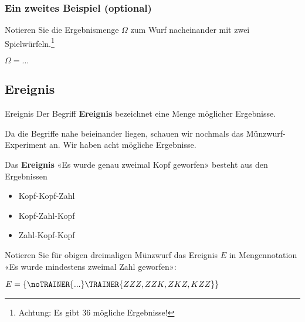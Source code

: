 \subsubsection{Ein zweites Beispiel (optional)}
Notieren Sie die Ergebnismenge $\Omega$ zum Wurf nacheinander mit zwei
Spielwürfeln.\footnote{Achtung: Es gibt 36 mögliche Ergebnisse!}

$\Omega=...$


\TNTeop{}

\newpage
\subsection{Ereignis}
\begin{definition}{Ereignis}{}
Der Begriff \textbf{Ereignis} bezeichnet eine Menge möglicher
Ergebnisse.
\end{definition}

Da die Begriffe nahe beieinander liegen, schauen wir
nochmals das Münzwurf-Experiment an. Wir haben acht mögliche
Ergebnisse. 


Das \textbf{Ereignis} «Es wurde genau zweimal Kopf geworfen» besteht
aus den Ergebnissen

\begin{itemize}
\item Kopf-Kopf-Zahl
\item Kopf-Zahl-Kopf
\item Zahl-Kopf-Kopf
\end{itemize}

Notieren Sie für obigen dreimaligen Münzwurf das Ereignis $E$ in Mengennotation «Es wurde mindestens
zweimal Zahl geworfen»:

$E = \{\noTRAINER{...}\TRAINER{ZZZ,ZZK, ZKZ, KZZ\}}$


